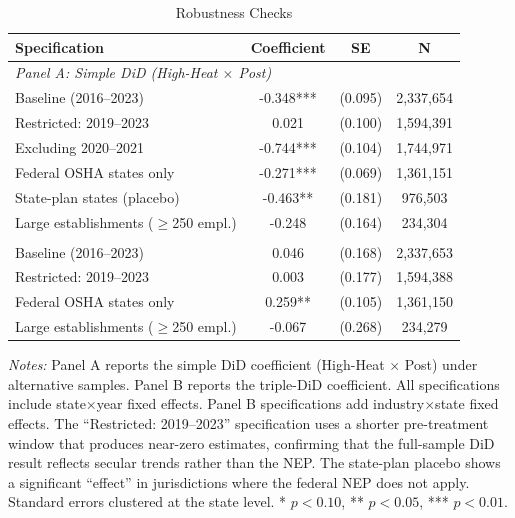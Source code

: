 \begin{table}[H]
\centering
\caption{Robustness Checks}
\label{tab:robust}
\begin{threeparttable}
\begin{tabular}{lccc}
\toprule
Specification & Coefficient & SE & N \\
\midrule
\multicolumn{4}{l}{\textit{Panel A: Simple DiD (High-Heat $\times$ Post)}} \\
Baseline (2016--2023) & -0.348*** & (0.095) & 2,337,654 \\
Restricted: 2019--2023 & 0.021 & (0.100) & 1,594,391 \\
Excluding 2020--2021 & -0.744*** & (0.104) & 1,744,971 \\
Federal OSHA states only & -0.271*** & (0.069) & 1,361,151 \\
State-plan states (placebo) & -0.463** & (0.181) & 976,503 \\
Large establishments ($\geq$250 empl.) & -0.248 & (0.164) & 234,304 \\
\addlinespace
\multicolumn{4}{l}{\textit{Panel B: Triple DiD (High-Heat $\times$ Post $\times$ Hot State)}} \\
Baseline (2016--2023) & 0.046 & (0.168) & 2,337,653 \\
Restricted: 2019--2023 & 0.003 & (0.177) & 1,594,388 \\
Federal OSHA states only & 0.259** & (0.105) & 1,361,150 \\
Large establishments ($\geq$250 empl.) & -0.067 & (0.268) & 234,279 \\
\bottomrule
\end{tabular}
\begin{tablenotes}[flushleft]
\small
\item \textit{Notes:} Panel A reports the simple DiD coefficient (High-Heat $\times$ Post) under alternative samples. Panel B reports the triple-DiD coefficient. All specifications include state$\times$year fixed effects. Panel B specifications add industry$\times$state fixed effects. The ``Restricted: 2019--2023'' specification uses a shorter pre-treatment window that produces near-zero estimates, confirming that the full-sample DiD result reflects secular trends rather than the NEP. The state-plan placebo shows a significant ``effect'' in jurisdictions where the federal NEP does not apply. Standard errors clustered at the state level. * $p<0.10$, ** $p<0.05$, *** $p<0.01$.
\end{tablenotes}
\end{threeparttable}
\end{table}

